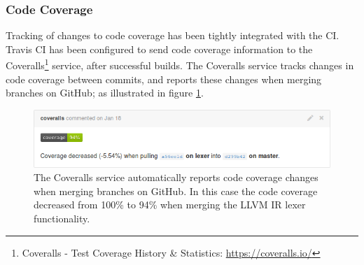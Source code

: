 
\subsubsection{Code Coverage}

Tracking of changes to code coverage has been tightly integrated with the CI. Travis CI has been configured to send code coverage information to the Coveralls\footnote{Coveralls - Test Coverage History \& Statistics: \url{https://coveralls.io/}} service, after successful builds. The Coveralls service tracks changes in code coverage between commits, and reports these changes when merging branches on GitHub; as illustrated in figure \ref{fig:coveralls}.

\begin{figure}[htbp]
	\begin{center}
		\includegraphics[width=\textwidth]{inc/coveralls.png}
		\caption{The Coveralls service automatically reports code coverage changes when merging branches on GitHub. In this case the code coverage decreased from 100\% to 94\% when merging the LLVM IR lexer functionality.}
		\label{fig:coveralls}
	\end{center}
\end{figure}

